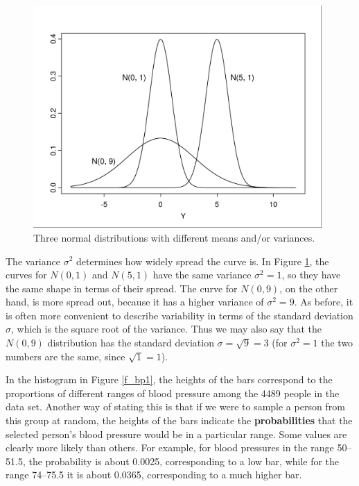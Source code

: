 \begin{figure}
\caption{Three normal distributions with different means and/or
variances.}
\label{f_3norms}
%
\begin{center}
\includegraphics[width=11cm]{threenorms}
\end{center}

\end{figure}

The variance $\sigma^{2}$ determines how widely spread the curve is. In
Figure \ref{f_3norms}, the curves for $N(0, 1)$ and $N(5, 1)$ have the
same variance $\sigma^{2}=1$, so they have the same shape in
terms of their spread. The curve for $N(0, 9)$, on the other hand, is
more spread out, because it has a higher variance of $\sigma^{2}=9$. As
before, it is often more convenient to describe variability in terms of
the standard deviation $\sigma$, which is the square root of the
variance. Thus we may also say that the $N(0, 9)$ distribution has the
standard deviation $\sigma=\sqrt{9}=3$ (for $\sigma^{2}=1$ the two
numbers are the same, since $\sqrt{1}=1$).

In the histogram in Figure \ref{f_bp1}, the heights of the bars
correspond to the proportions of different ranges of blood
pressure among the 4489 people in the data set. Another way of stating
this is that if we were to sample a person from this group at random,
the heights of the
bars indicate the \textbf{probabilities} that the selected person's
blood pressure would be in a particular range. Some values are clearly
more likely than others. For example, for blood
pressures in the range 50--51.5, the probability is about 0.0025,
corresponding to a low bar, while for the range 74--75.5 it is about
0.0365, corresponding to a much higher bar.

